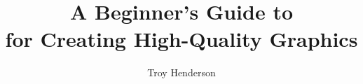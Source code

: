 \documentclass[11pt]{article}
\begin{document}
\title{A Beginner's Guide to \MP{}\\for Creating High-Quality Graphics}
\author{Troy Henderson}
\maketitle










\end{document}
